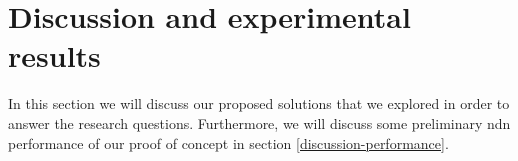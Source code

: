 \section{Discussion and experimental results}\label{disc}







In this section we will discuss our proposed solutions that we explored in order to answer the research questions. Furthermore, we will discuss some preliminary \gls{ndn} performance of our proof of concept in section \ref{discussion-performance}.







